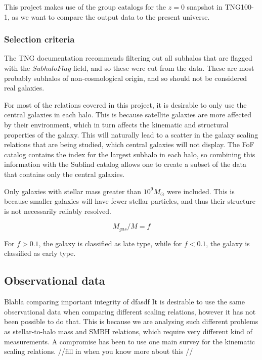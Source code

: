 This project makes use of the group catalogs for the $z = 0$ snapshot in TNG100-1, as we want to compare the output data to the present universe.

\subsubsection{Selection criteria} %

The TNG documentation recommends filtering out all subhalos that are flagged with the $SubhaloFlag$ field, and so these were cut from the data. These are most probably subhalos of non-cosmological origin, and so should not be considered real galaxies.

For most of the relations covered in this project, it is desirable to only use the central galaxies in each halo. This is because satellite galaxies are more affected by their environment, which in turn affects the kinematic and structural properties of the galaxy. This will naturally lead to a scatter in the galaxy scaling relations that are being studied, which central galaxies will not display. The FoF catalog contains the index for the largest subhalo in each halo, so combining this information with the Subfind catalog allows one to create a subset of the data that contains only the central galaxies.

Only galaxies with stellar mass greater than $10^9 M_{\odot}$ were included. This is because smaller galaxies will have fewer stellar particles, and thus their structure is not necessarily reliably resolved.

\begin{equation}
    M_{gas}/M  = f
\end{equation}

For $f > 0.1$, the galaxy is classified as late type, while for $f< 0.1$, the galaxy is classified as early type.

\subsection{Observational data}
Blabla comparing important integrity of dfasdf
It is desirable to use the same observational data when comparing different scaling relations, however it has not been possible to do that. This is because we are analysing such different problems as stellar-to-halo mass and SMBH relations, which require very different kind of measurements. A compromise has been to use one main survey for the kinematic scaling relations. //fill in when you know more about this //

